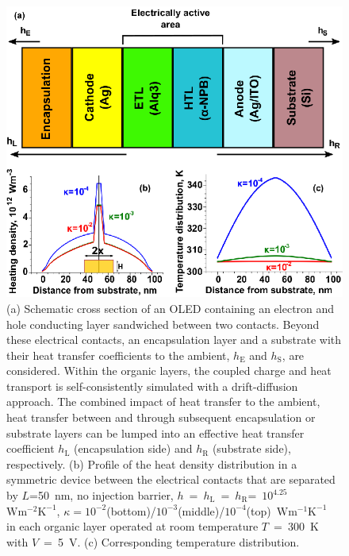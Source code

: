 \documentclass[%
9pt,
 aip,
rsi,%
 amsmath,amssymb,
preprint,%
]{revtex4-1}
\newcommand{\thermalconductivity}{$\mathrm{W m^{-1} K^{-1}}$}
\newcommand{\hcoefficient}{$\mathrm{W m^{-2} K^{-1}}$}
\begin{document}
\begin{figure}
	\centering
    \includegraphics{General_plots_0.eps}
    \caption{(a) Schematic cross section of an OLED containing an electron and hole conducting layer sandwiched between two contacts. 
    Beyond these electrical contacts, an encapsulation layer and a substrate with their heat transfer coefficients to the ambient, $h_{\mathrm{E}}$ and $h_{\mathrm{S}}$, are considered. 
    Within the organic layers, the coupled charge and heat transport is self-consistently simulated with a drift-diffusion approach. 
    The combined impact of heat transfer to the ambient, heat transfer between and through subsequent encapsulation or substrate layers can be lumped into an effective heat transfer coefficient %
    $h_{\mathrm{L}}$ (encapsulation side) and $h_{\mathrm{R}}$ (substrate side), respectively.
    (b) Profile of the heat density distribution in a symmetric device between the electrical contacts that are separated by $L$=50~nm, no injection barrier,  $h$~=~$h_{\mathrm{L}}$~=~$h_{\mathrm{R}}$=~$10^{4.25}$~\hcoefficient, $\kappa=10^{-2}$(bottom)/$10^{-3}$(middle)/$10^{-4}$(top)~\thermalconductivity~ in each organic layer operated at room temperature $T$~=~300~K with $V$~=~5~V. 
    (c) Corresponding temperature distribution.}
\label{fig:setup}
\end{figure}
\end{document}
